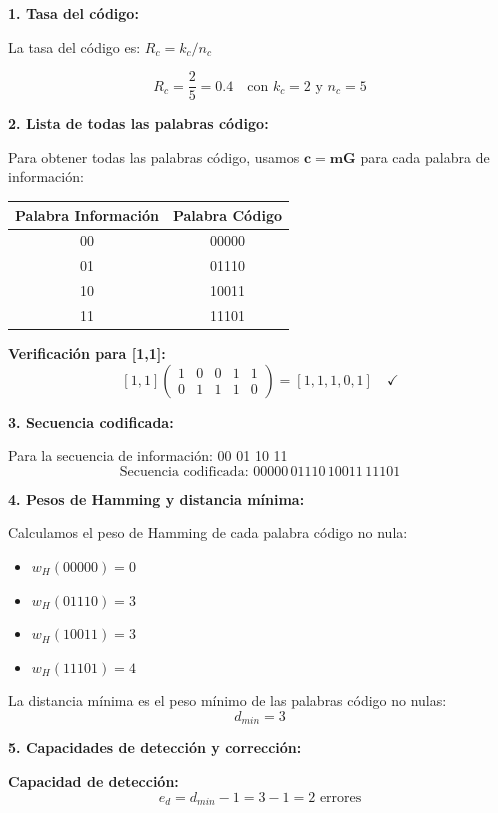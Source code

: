 \documentclass[10pt,a4paper]{article}
\begin{document}
\begin{solucion}
\textbf{1. Tasa del código:}

La tasa del código es: $R_c = k_c/n_c$

\[
\boxed{R_c = \frac{2}{5} = 0.4 \quad \text{con } k_c = 2 \text{ y } n_c = 5}
\]

\textbf{2. Lista de todas las palabras código:}

Para obtener todas las palabras código, usamos $\mathbf{c} = \mathbf{m} \mathbf{G}$ para cada palabra de información:

\begin{center}
\begin{tabular}{|c|c|}
\hline
\textbf{Palabra Información} & \textbf{Palabra Código} \\
\hline
00 & 00000 \\
01 & 01110 \\
10 & 10011 \\
11 & 11101 \\
\hline
\end{tabular}
\end{center}

\textbf{Verificación para [1,1]:}
\[
[1, 1] \begin{pmatrix} 1 & 0 & 0 & 1 & 1\\ 0 & 1 & 1 & 1 & 0 \end{pmatrix} = [1, 1, 1, 0, 1] \quad \checkmark
\]

\textbf{3. Secuencia codificada:}

Para la secuencia de información: 00 01 10 11
\[
\boxed{\text{Secuencia codificada: } 00000\,01110\,10011\,11101}
\]

\textbf{4. Pesos de Hamming y distancia mínima:}

Calculamos el peso de Hamming de cada palabra código no nula:
\begin{itemize}
\item $w_H(00000) = 0$
\item $w_H(01110) = 3$
\item $w_H(10011) = 3$
\item $w_H(11101) = 4$
\end{itemize}

La distancia mínima es el peso mínimo de las palabras código no nulas:
\[
\boxed{d_{min} = 3}
\]

\textbf{5. Capacidades de detección y corrección:}

\textbf{Capacidad de detección:}
\[
\boxed{e_d = d_{min} - 1 = 3 - 1 = 2 \text{ errores}}
\]


\end{solucion}
\end{document}
